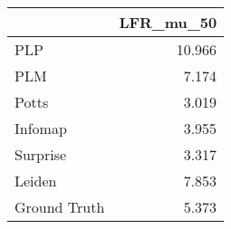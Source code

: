 \begin{tabular}{lr}
\toprule
{} & LFR_mu_50 \\
\midrule
PLP          &    10.966 \\
PLM          &     7.174 \\
Potts        &     3.019 \\
Infomap      &     3.955 \\
Surprise     &     3.317 \\
Leiden       &     7.853 \\
Ground Truth &     5.373 \\
\bottomrule
\end{tabular}
